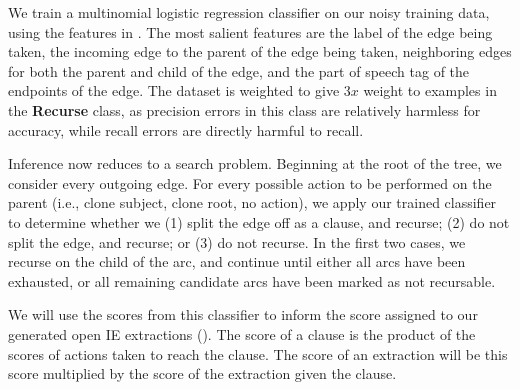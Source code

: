 We train a multinomial logistic regression classifier on our noisy
  training data, using the features in .
The most salient features are the label of the edge being taken, the
  incoming edge to the parent of the edge being taken, neighboring edges
  for both the parent and child of the edge, and the part of speech tag of
  the endpoints of the edge.
The dataset is weighted to give $3x$ weight to examples in the \textbf{Recurse}
  class, as precision errors in this class are relatively harmless for accuracy,
  while recall errors are directly harmful to recall.


Inference now reduces to a search problem.
Beginning at the root of the tree, we consider every outgoing edge.
  For every possible action to be performed on the parent (i.e., clone subject,
  clone root, no action), we apply our trained classifier to determine
  whether we 
  (1) split the edge off as a clause, and recurse;
  (2) do not split the edge, and recurse; or 
  (3) do not recurse.
In the first two cases, we recurse on the child of the arc, and continue until
  either all arcs have been exhausted, or all remaining candidate arcs
  have been marked as not recursable.

We will use the scores from this classifier to inform the score assigned to
  our generated open IE extractions ().
The score of a clause is the product of the scores of actions taken to reach
  the clause.
The score of an extraction will be this score multiplied by the score
  of the extraction given the clause.
